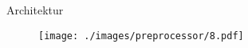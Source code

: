 \begin{frame}{Architektur}
    \begin{figure}
    	\centering
    	\texttt{[image: ./images/preprocessor/8.pdf]}
    \end{figure}
\end{frame}
